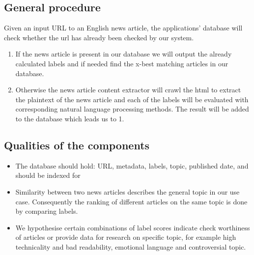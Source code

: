\documentclass[10pt]{article}
\begin{document}
\subsection{General procedure}
Given an input URL to an English news article, the applications' database will check whether the url has already been checked by our system.
\begin{enumerate}
\item If the news article is present in our database we will output the already calculated labels and if needed find the x-best matching articles in our database.
\item Otherwise the news article content extractor will crawl the html to extract the plaintext of the news article and each of the labels will be evaluated with corresponding natural language processing methods. The result will be added to the database which leads us to 1.
\end{enumerate}

\subsection{Qualities of the components}
\begin{itemize}
\item The database should hold: URL, metadata, labels, topic, published date, and should be indexed for 
\item Similarity between two news articles describes the general topic in our use case. Consequently the ranking of different articles on the same topic is done by comparing labels.
\item We hypothesise certain combinations of label scores indicate check worthiness of articles or provide data for research on specific topic, for example high technicality and bad readability, emotional language and controversial topic.
\end{itemize}
\end{document}
